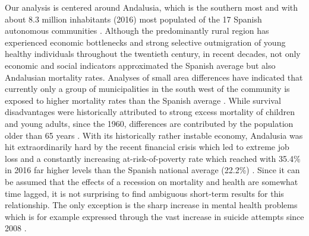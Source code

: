 \documentclass[a4paper,10pt,oneside,english]{article}
\begin{document}
Our analysis is centered around Andalusia, which is the southern most and with about 8.3 million inhabitants (2016) most populated of the 17 Spanish autonomous communities \citep{RN113}. 
Although the predominantly rural region has experienced economic bottlenecks and strong selective outmigration of young healthy individuals throughout the twentieth century, in recent decades, not only economic and social indicators approximated the Spanish average but also Andalusian mortality rates. Analyses of small area differences have indicated that currently only a group of municipalities in the south west of the community is exposed to higher mortality rates than the Spanish average \citep{RN100}. While survival disadvantages were historically attributed to strong excess mortality of children and young adults, since the 1960, differences are contributed by the population older than 65 years \citep{RN105}.
With its historically rather instable economy, Andalusia was hit extraordinarily hard by the recent financial crisis which led to extreme job loss and a constantly increasing at-risk-of-poverty rate which reached with 35.4\% in 2016 far higher levels than the Spanish national average (22.2\%) \citep{RN184}. Since it can be assumed that the effects of a recession on mortality and health are somewhat time lagged, it is not surprising to find ambiguous short-term results for this relationship. The only exception is the sharp increase in mental health problems which is for example expressed through the vast increase in suicide attempts since 2008 \citep{RN136}.
\end{document}
